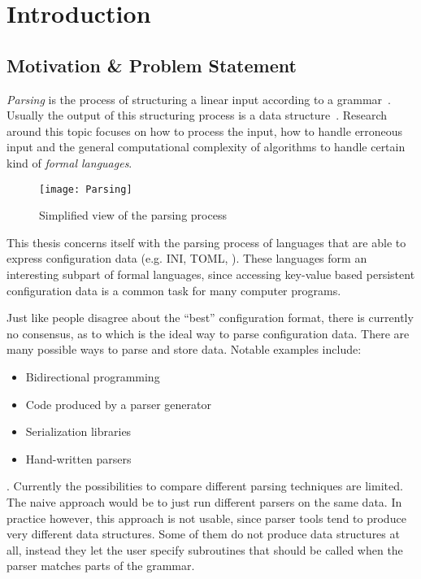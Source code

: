 \chapter{Introduction}

\section{Motivation \& Problem Statement}

\emph{Parsing} is the process of structuring a linear input according to a grammar~\cite{grune2008parsing}. Usually the output of this structuring process is a data structure~\cite{wikipedia2019Parser}. Research around this topic focuses on how to process the input, how to handle erroneous input and the general computational complexity of algorithms to handle certain kind of \emph{formal languages}.

\begin{figure}[H]
  \centering
    \texttt{[image: Parsing]}
  \caption{Simplified view of the parsing process}
\end{figure}

This thesis concerns itself with the parsing process of languages that are able to express configuration data (e.g. INI, TOML, ). These languages form an interesting subpart of formal languages, since accessing key-value based persistent configuration data is a common task for many computer programs.

Just like people disagree about the “best” configuration format, there is currently no consensus, as to which is the ideal way to parse configuration data. There are many possible ways to parse and store data. Notable examples include:

\begin{itemize}
  \item Bidirectional programming~\cite{foster2005combinators, bohannon2006relational, lutterkort2008augeas, ko2016bigul, raab2016improving}
  \item Code produced by a parser generator~\cite{denny2008ielr, parr2014adaptive, warth2016modular, bates2017aprt}
  \item Serialization libraries~\cite{sumaray2012cds, pacini2015performance}
  \item Hand-written parsers~\cite{myers2008cparser, bendersky2012clang}
\end{itemize}

. Currently the possibilities to compare different parsing techniques are limited. The naive approach would be to just run different parsers on the same data. In practice however, this approach is not usable, since parser tools tend to produce very different data structures. Some of them do not produce data structures at all, instead they let the user specify subroutines that should be called when the parser matches parts of the grammar.


